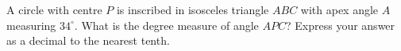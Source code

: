 A circle with centre $P$ is inscribed in isosceles triangle $ABC$ with apex angle $A$ measuring $34^\circ$. What is the degree measure of angle $APC$? Express your answer as a decimal to the nearest tenth.
